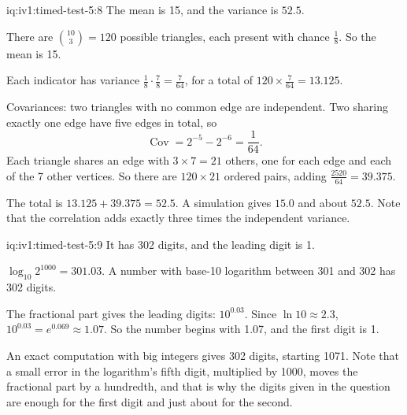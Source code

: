 \begin{solution}{iq:iv1:timed-test-5:8}
The mean is 15, and the variance is $52.5$.

There are $\binom{10}{3} = 120$ possible triangles, each present with chance $\frac18$. So the mean is 15.

Each indicator has variance $\frac18 \cdot \frac78 = \frac{7}{64}$, for a total of $120 \times \frac{7}{64} = 13.125$.

Covariances: two triangles with no common edge are independent. Two sharing exactly one edge have five edges in total, so
\[
\operatorname{Cov} = 2^{-5} - 2^{-6} = \frac{1}{64}.
\]
Each triangle shares an edge with $3 \times 7 = 21$ others, one for each edge and each of the 7 other vertices. So there are $120 \times 21$ ordered pairs, adding $\frac{2520}{64} = 39.375$.

The total is $13.125 + 39.375 = 52.5$. A simulation gives $15.0$ and about $52.5$. Note that the correlation adds exactly three times the independent variance.

\end{solution}

\begin{solution}{iq:iv1:timed-test-5:9}
It has 302 digits, and the leading digit is 1.

$\log_{10}2^{1000} = 301.03$. A number with base-10 logarithm between 301 and 302 has 302 digits.

The fractional part gives the leading digits: $10^{0.03}$. Since $\ln 10 \approx 2.3$, $10^{0.03} = e^{0.069} \approx 1.07$. So the number begins with 1.07, and the first digit is 1.

An exact computation with big integers gives 302 digits, starting 1071. Note that a small error in the logarithm's fifth digit, multiplied by 1000, moves the fractional part by a hundredth, and that is why the digits given in the question are enough for the first digit and just about for the second.

\end{solution}

